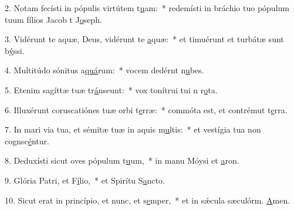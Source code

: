 2. Notam fecísti in pópulis virtútem t\uline{u}am:~* redemísti in bráchio tuo pópulum tuum fílios Jacob t J\uline{o}seph.\par 
3. Vidérunt te aquæ, Deus, vidérunt te \uline{a}quæ:~* et timuérunt et turbátæ sunt b\uline{ý}ssi.\par 
4. Multitúdo sónitus a\uline{quá}rum:~* vocem dedérnt n\uline{u}bes.\par 
5. Etenim sagíttæ tuæ tr\uline{á}nseunt:~* vox tonítrui tui n r\uline{o}ta.\par 
6. Illuxérunt coruscatiónes tuæ orbi t\uline{e}rræ:~* commóta est, et contrémut t\uline{e}rra.\par 
7. In mari via tua, et sémitæ tuæ in aquis m\uline{u}ltis:~* et vestígia tua non cognsc\uline{é}ntur.\par 
8. Deduxísti sicut oves pópulum t\uline{u}um,~* in manu Móysi et \uline{a}ron.\par 
9. Glória Patri, et F\uline{í}lio,~* et Spirítu S\uline{a}ncto.\par 
10. Sicut erat in princípio, et nunc, et s\uline{e}mper,~* et in sǽcula sæculórm. \uline{A}men.\par 
